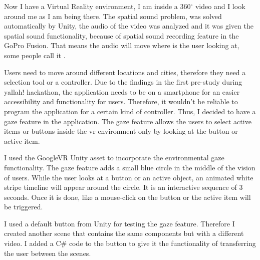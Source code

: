 Now I have a Virtual Reality environment, I am inside a 360$^{\circ}$ video and I look around me as I am being there. The spatial sound problem, was solved automatically by Unity, the audio of the video was analyzed and it was given the spatial sound functionality, because of spatial sound recording feature in the GoPro Fusion. That means the audio will move where is the user looking at, some people call it .   

Users need to move around different locations and cities, therefore they need a selection tool or a controller. Due to the findings in the first pre-study during \acrfull{yallah!} hackathon, the application needs to be on a smartphone for an easier accessibility and functionality for users. Therefore, it wouldn't be reliable to program the application for a certain kind of controller. Thus, I decided to have a gaze feature in the application. The gaze feature allows the users to select active items or buttons inside the \acrshort{vr} environment only by looking at the button or active item. 


I used the GoogleVR Unity asset to incorporate the environmental gaze functionality. The gaze feature adds a small blue circle in the middle of the vision of users. While the user looks at a button or an active object, an animated white stripe timeline will appear around the circle. It is an interactive sequence of 3 seconds. Once it is done, like a mouse-click on the button or the active item will be triggered. 

I used a default button from Unity for testing the gaze feature. Therefore I created another scene that contains the same components but with a different video. I added a C\# code to the button to give it the functionality of transferring the user between the scenes. 

